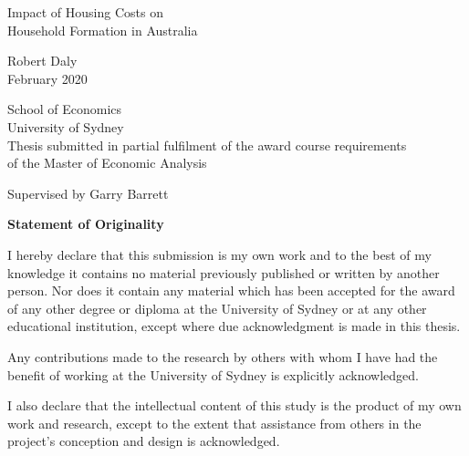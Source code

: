 \documentclass[12pt]{article}
\newcommand{\heading}[1] {\begin{center} \textbf{#1} \end{center}}
\begin{document}
\begin{titlepage}
    \begin{center}
        \vspace*{2cm}

        \huge
        Impact of Housing Costs on \\Household Formation in Australia
        \vspace{2cm}

        \large
        Robert Daly\\
        \vspace{1cm}
        February 2020 \\

        \vspace{1cm}

        School of Economics\\
        University of Sydney\\

        \vspace{1cm}
        Thesis submitted in partial fulfilment of the award course requirements \\
        of the Master of Economic Analysis

        \vspace{1cm}
        Supervised by  Garry Barrett

        \normalsize

    \end{center}
\end{titlepage}

\pagebreak
\heading{Statement of Originality}
I hereby declare that this submission is my own work and to the best of my knowledge it contains no material previously published or written by another person.  Nor does it contain any material which has been accepted for the award of any other degree or diploma at the University of Sydney or at any other educational institution, except where due acknowledgment is made in this thesis.

Any contributions made to the research by others with whom I have had the benefit of working at the University of Sydney is explicitly acknowledged.

I also declare that the intellectual content of this study is the product of my own work and research, except to the extent that assistance from others in the project’s conception and design is acknowledged.

\vspace{2.0cm}
\end{document}
